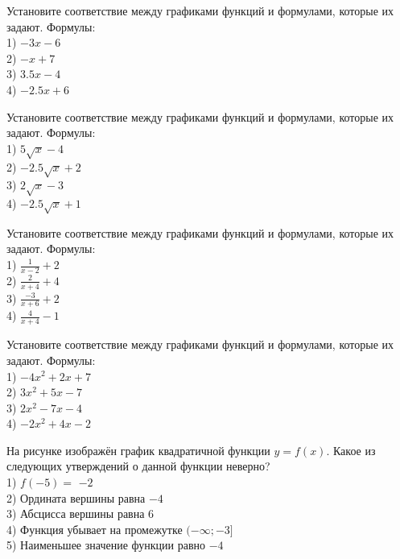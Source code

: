 \documentclass[4apaper]{article}
\begin{document}
\begin{taskBN}{49}
Установите соответствие между графиками функций и формулами, которые их задают. Формулы: \\1) $-3x-6$\\2) $-x+7$\\3) $3.5x-4$\\4) $-2.5x+6$
\end{taskBN}

\begin{taskBN}{50}
Установите соответствие между графиками функций и формулами, которые их задают. Формулы: \\1) $5\sqrt{x}-4$\\2) $-2.5\sqrt{x}+2$\\3) $2\sqrt{x}-3$\\4) $-2.5\sqrt{x}+1$
\end{taskBN}

\begin{taskBN}{51}
Установите соответствие между графиками функций и формулами, которые их задают. Формулы: \\1) $\frac{1}{x-2}+2$\\2) $\frac{2}{x+4}+4$\\3) $\frac{-3}{x+6}+2$\\4) $\frac{4}{x+4}-1$
\end{taskBN}

\begin{taskBN}{52}
Установите соответствие между графиками функций и формулами, которые их задают. Формулы: \\1) $-4x^2+2x+7$\\2) $3x^2+5x-7$\\3) $2x^2-7x-4$\\4) $-2x^2+4x-2$
\end{taskBN}

\begin{taskBN}{53}
На рисунке изображён график квадратичной функции $y=f(x)$. Какое из следующих утверждений о данной функции неверно?\\1) $f(-5)=$ $-2$\\2) Ордината вершины равна $-4$\\3) Абсцисса вершины равна $6$\\4) Функция убывает на промежутке $(-\infty;-3]$\\5) Наименьшее значение функции равно  $-4$
\end{taskBN}
\end{document}
